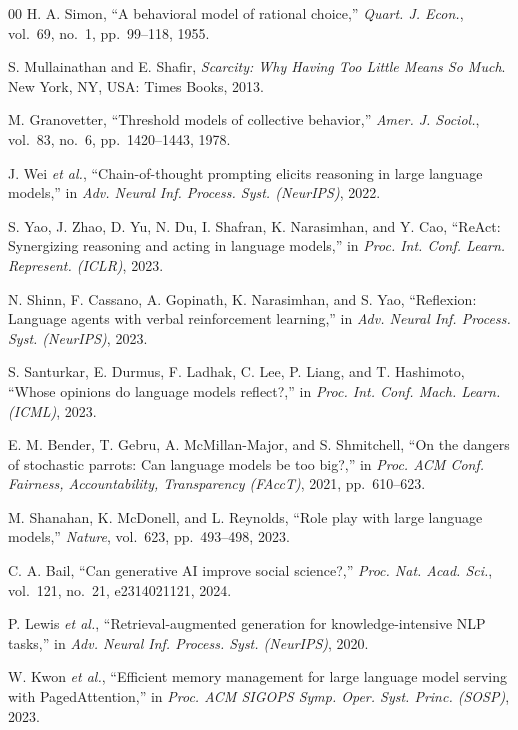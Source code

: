 \documentclass[conference]{IEEEtran}
\begin{document}
\begin{thebibliography}{00}
 H. A. Simon, ``A behavioral model of rational choice,'' \emph{Quart. J. Econ.}, vol.\ 69, no.\ 1, pp.\ 99--118, 1955.

 S. Mullainathan and E. Shafir, \emph{Scarcity: Why Having Too Little Means So Much}. New York, NY, USA: Times Books, 2013.

 M. Granovetter, ``Threshold models of collective behavior,'' \emph{Amer. J. Sociol.}, vol.\ 83, no.\ 6, pp.\ 1420--1443, 1978.

 J. Wei \emph{et al.}, ``Chain-of-thought prompting elicits reasoning in large language models,'' in \emph{Adv. Neural Inf. Process. Syst. (NeurIPS)}, 2022.

 S. Yao, J. Zhao, D. Yu, N. Du, I. Shafran, K. Narasimhan, and Y. Cao, ``ReAct: Synergizing reasoning and acting in language models,'' in \emph{Proc. Int. Conf. Learn. Represent. (ICLR)}, 2023.

 N. Shinn, F. Cassano, A. Gopinath, K. Narasimhan, and S. Yao, ``Reflexion: Language agents with verbal reinforcement learning,'' in \emph{Adv. Neural Inf. Process. Syst. (NeurIPS)}, 2023.

 S. Santurkar, E. Durmus, F. Ladhak, C. Lee, P. Liang, and T. Hashimoto, ``Whose opinions do language models reflect?,'' in \emph{Proc. Int. Conf. Mach. Learn. (ICML)}, 2023.

 E. M. Bender, T. Gebru, A. McMillan-Major, and S. Shmitchell, ``On the dangers of stochastic parrots: Can language models be too big?,'' in \emph{Proc. ACM Conf. Fairness, Accountability, Transparency (FAccT)}, 2021, pp.\ 610--623.

 M. Shanahan, K. McDonell, and L. Reynolds, ``Role play with large language models,'' \emph{Nature}, vol.\ 623, pp.\ 493--498, 2023.

 C. A. Bail, ``Can generative AI improve social science?,'' \emph{Proc. Nat. Acad. Sci.}, vol.\ 121, no.\ 21, e2314021121, 2024.

 P. Lewis \emph{et al.}, ``Retrieval-augmented generation for knowledge-intensive NLP tasks,'' in \emph{Adv. Neural Inf. Process. Syst. (NeurIPS)}, 2020.

 W. Kwon \emph{et al.}, ``Efficient memory management for large language model serving with PagedAttention,'' in \emph{Proc. ACM SIGOPS Symp. Oper. Syst. Princ. (SOSP)}, 2023.


\end{thebibliography}
\end{document}
